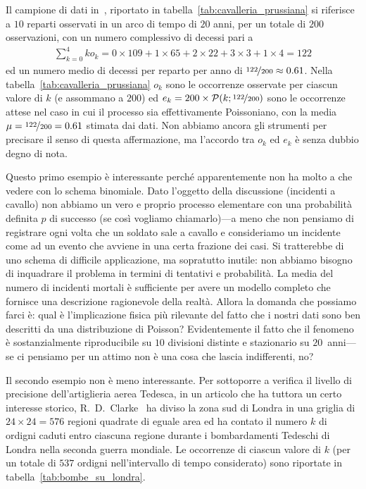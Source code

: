 Il campione di dati in~\cite{bortkiewicz}, riportato in
tabella~\ref{tab:cavalleria_prussiana} si riferisce a $10$ reparti osservati
in un arco di tempo di $20$ anni, per un totale di $200$ osservazioni, con un
numero complessivo di decessi pari a
\begin{align*}
  \sum_{k = 0}^4 ko_k =
  0 \times 109 + 1 \times 65 + 2 \times 22 + 3 \times 3 + 1 \times 4 = 122
\end{align*}
ed un numero medio di decessi per reparto per anno di
$\nicefrac{122}{200} \approx 0.61$. Nella tabella~\ref{tab:cavalleria_prussiana}
$o_k$ sono le occorrenze osservate per ciascun valore di $k$ (e assommano
a $200$) ed $e_k = 200 \times \poissonpdf[\nicefrac{122}{200}]{k}$ sono le
occorrenze attese nel caso in cui il processo sia effettivamente Poissoniano,
con la media $\mu = \nicefrac{122}{200} = 0.61$ stimata dai dati. Non abbiamo
ancora gli strumenti per precisare il senso di questa affermazione,
ma l'accordo tra $o_k$ ed $e_k$ è senza dubbio degno di nota.

Questo primo esempio è interessante perché apparentemente non ha molto a che
vedere con lo schema binomiale. Dato l'oggetto della discussione (incidenti a
cavallo) non abbiamo un vero e proprio processo elementare con una probabilità
definita $p$ di successo (se così vogliamo chiamarlo)---a meno che non
pensiamo di registrare ogni volta che un soldato sale a cavallo e consideriamo
un incidente come ad un evento che avviene in una certa frazione dei casi.
Si tratterebbe di uno schema di difficile applicazione, ma sopratutto inutile:
non abbiamo bisogno di inquadrare il problema in termini di tentativi e
probabilità. La media del numero di incidenti mortali è sufficiente per
avere un modello completo che fornisce una descrizione ragionevole della
realtà. Allora la domanda che possiamo farci è: qual è l'implicazione
fisica più rilevante del fatto che i nostri dati sono ben descritti da una
distribuzione di Poisson? Evidentemente il fatto che il fenomeno è
sostanzialmente riproducibile su $10$ divisioni distinte e stazionario su
$20$~anni---se ci pensiamo per un attimo non è una cosa che lascia
indifferenti, no?

Il secondo esempio non è meno interessante. Per sottoporre a verifica il
livello di precisione dell'artiglieria aerea Tedesca, in un articolo che ha
tuttora un certo interesse storico, R.~D.~Clarke~\cite{clarke} ha diviso la
zona sud di Londra in una griglia di $24 \times 24 = 576$ regioni quadrate di
eguale area ed ha contato il numero $k$ di ordigni caduti entro ciascuna regione
durante i bombardamenti Tedeschi di Londra nella seconda guerra mondiale.
Le occorrenze di ciascun valore di $k$ (per un totale di $537$ ordigni
nell'intervallo di tempo considerato) sono riportate in
tabella~\ref{tab:bombe_su_londra}.


